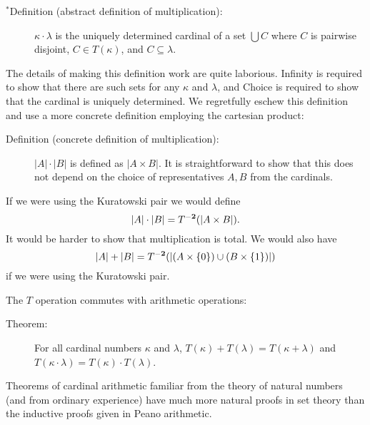 \documentclass[12pt]{book}
\begin{document}
\begin{description}

\item[$^*$Definition (abstract definition of multiplication):] $\kappa\cdot\lambda$ is
the uniquely determined cardinal of a set $\bigcup C$ where $C$ is
pairwise disjoint, $C \in T(\kappa)$, and $C \subseteq \lambda$.

\end{description}

The details of making this definition work are quite laborious.
Infinity is required to show that there are such sets for any $\kappa$
and $\lambda$, and Choice is required to show that the cardinal is
uniquely determined.  We regretfully eschew this definition and use a more concrete definition employing the cartesian product:

\begin{description}

\item[Definition (concrete definition of multiplication):] $|A| \cdot |B|$ is
defined as $|A \times B|$.  It is straightforward to show that this
does not depend on the choice of representatives $A, B$ from the
cardinals.

\end{description}

If we were using the Kuratowski pair we would define $$|A| \cdot |B| =
T^{\bf -2}(|A \times B|).$$ It would be harder to show that multiplication
is total.  We would also have $$|A| + |B| = T^{\bf -2}(|(A \times \{0\})
\cup (B \times \{1\})|)$$  if we were using the Kuratowski pair.

The $T$ operation commutes with arithmetic operations:  

\begin{description}

\item[Theorem:] For all cardinal numbers $\kappa$ and $\lambda$,
$T(\kappa)+T(\lambda)=T(\kappa+\lambda)$ and $T(\kappa\cdot \lambda) =
T(\kappa)\cdot T(\lambda)$.

\end{description}

Theorems of cardinal arithmetic familiar from the theory of natural
numbers (and from ordinary experience) have much more natural proofs
in set theory than the inductive proofs given in Peano arithmetic.
\end{document}
